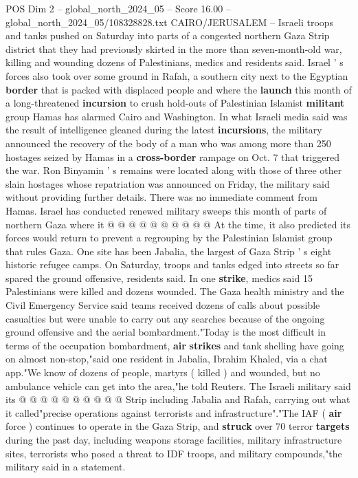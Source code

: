 \begin{textsample}{POS Dim 2 – global\_north\_2024\_05 – Score 16.00 – global\_north\_2024\_05/108328828.txt}  \label{ex:f2_pos_387}
CAIRO/JERUSALEM -- Israeli troops and tanks pushed on Saturday into parts of a congested northern Gaza Strip district that they had previously skirted in the more than seven-month-old war, killing and wounding dozens of Palestinians, medics and residents said.
Israel ' s forces also took over some ground in Rafah, a southern city next to the Egyptian \textbf{border} that is packed with displaced people and where the \textbf{launch} this month of a long-threatened \textbf{incursion} to crush hold-outs of Palestinian Islamist \textbf{militant} group Hamas has alarmed Cairo and Washington.
In what Israeli media said was the result of intelligence gleaned during the latest \textbf{incursions}, the military announced the recovery of the body of a man who was among more than 250 hostages seized by Hamas in a \textbf{cross-border} rampage on Oct. 7 that triggered the war.
Ron Binyamin ' s remains were located along with those of three other slain hostages whose repatriation was announced on Friday, the military said without providing further details.
There was no immediate comment from Hamas.
Israel has conducted renewed military sweeps this month of parts of northern Gaza where it @ @ @ @ @ @ @ @ @ @ At the time, it also predicted its forces would return to prevent a regrouping by the Palestinian Islamist group that rules Gaza.
One site has been Jabalia, the largest of Gaza Strip ' s eight historic refugee camps.
On Saturday, troops and tanks edged into streets so far spared the ground offensive, residents said.
In one \textbf{strike}, medics said 15 Palestinians were killed and dozens wounded.
The Gaza health ministry and the Civil Emergency Service said teams received dozens of calls about possible casualties but were unable to carry out any searches because of the ongoing ground offensive and the aerial bombardment."Today is the most difficult in terms of the occupation bombardment, \textbf{air} \textbf{strikes} and tank shelling have going on almost non-stop,"said one resident in Jabalia, Ibrahim Khaled, via a chat app."We know of dozens of people, martyrs ( killed ) and wounded, but no ambulance vehicle can get into the area,"he told Reuters.
The Israeli military said its @ @ @ @ @ @ @ @ @ @ Strip including Jabalia and Rafah, carrying out what it called"precise operations against terrorists and infrastructure"."The IAF ( \textbf{air} force ) continues to operate in the Gaza Strip, and \textbf{struck} over 70 terror \textbf{targets} during the past day, including weapons storage facilities, military infrastructure sites, terrorists who posed a threat to IDF troops, and military compounds,"the military said in a statement.

\end{textsample}
